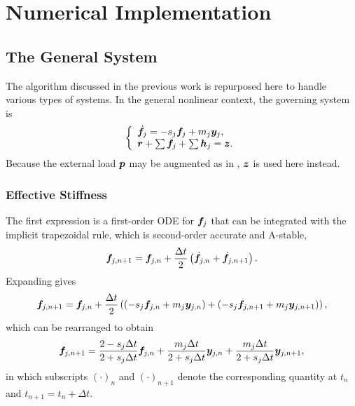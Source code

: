 \section{Numerical Implementation}
\subsection{The General System}
The algorithm discussed in the previous work \citep{Chang2024} is repurposed here to handle various types of systems.
In the general nonlinear context, the governing system is
\begin{gather}\label{eq:eqv_sys}
    \left\{
    \begin{array}{l}
        \dot{\bm{f}}_j=-s_j\bm{f}_j+m_j\bm{y}_j, \\
        \bm{r}+\sum\bm{f}_j+\sum\bm{h}_j=\bm{z}.
    \end{array}\right.
\end{gather}
Because the external load $\bm{p}$ may be augmented as in , $\bm{z}$ is used here instead.
\subsubsection{Effective Stiffness}
The first expression is a first-order ODE for $\bm{f}_j$ that can be integrated with the implicit trapezoidal rule, which is second-order accurate and A-stable,
\begin{gather}
    \bm{f}_{j,n+1}=\bm{f}_{j,n}+\dfrac{\Delta{}t}{2}\left(\dot{\bm{f}}_{j,n}+\dot{\bm{f}}_{j,n+1}\right).
\end{gather}
Expanding gives
\begin{gather}
    \bm{f}_{j,n+1}=\bm{f}_{j,n}+\dfrac{\Delta{}t}{2}\left(\left(-s_j\bm{f}_{j,n}+m_j\bm{y}_{j,n}\right)+\left(-s_j\bm{f}_{j,n+1}+m_j\bm{y}_{j,n+1}\right)\right),
\end{gather}
which can be rearranged to obtain
\begin{gather}\label{eq:discretised_c}
    \bm{f}_{j,n+1}=\dfrac{2-s_j\Delta{}t}{2+s_j\Delta{}t}\bm{f}_{j,n}+\dfrac{m_j\Delta{}t}{2+s_j\Delta{}t}\bm{y}_{j,n}+\dfrac{m_j\Delta{}t}{2+s_j\Delta{}t}\bm{y}_{j,n+1},
\end{gather}
in which subscripts $\left(\cdot\right)_n$ and $\left(\cdot\right)_{n+1}$ denote the corresponding quantity at $t_n$ and $t_{n+1}=t_n+\Delta{}t$.

